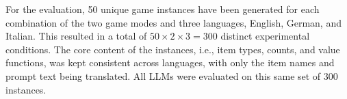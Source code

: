 For the evaluation, 50 unique game instances have been generated for each combination of the two game modes and three languages, English, German, and Italian. This resulted in a total of $50 \times 2 \times 3 = 300$ distinct experimental conditions. The core content of the instances, i.e., item types, counts, and value functions, was kept consistent across languages, with only the item names and prompt text being translated. All LLMs were evaluated on this same set of $300$ instances.

